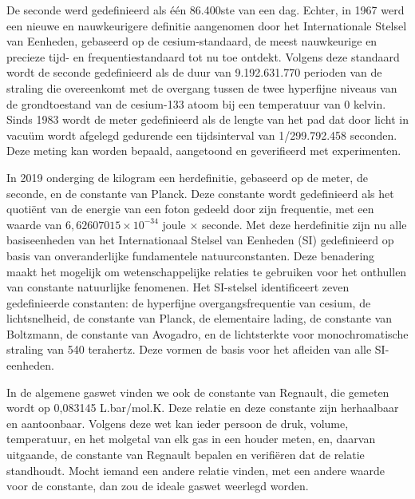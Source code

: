 \documentclass[
  a5paper,
  smalldemyvopaper,11pt,twoside,onecolumn,openright,extrafontsizes,
hidelinks]{memoir}
\begin{document}
De seconde werd gedefinieerd als één 86.400ste van een dag. Echter, in
1967 werd een nieuwe en nauwkeurigere definitie aangenomen door het
Internationale Stelsel van Eenheden, gebaseerd op de cesium-standaard,
de meest nauwkeurige en precieze tijd- en frequentiestandaard tot nu toe
ontdekt. Volgens deze standaard wordt de seconde gedefinieerd als de
duur van 9.192.631.770 perioden van de straling die overeenkomt met de
overgang tussen de twee hyperfijne niveaus van de grondtoestand van de
cesium-133 atoom bij een temperatuur van 0 kelvin. Sinds 1983 wordt de
meter gedefinieerd als de lengte van het pad dat door licht in vacuüm
wordt afgelegd gedurende een tijdsinterval van 1/299.792.458 seconden.
Deze meting kan worden bepaald, aangetoond en geverifieerd met
experimenten.

In 2019 onderging de kilogram een herdefinitie, gebaseerd op de meter,
de seconde, en de constante van Planck. Deze constante wordt
gedefinieerd als het quotiënt van de energie van een foton gedeeld door
zijn frequentie, met een waarde van \(6,62607015 \times 10^{-34}\) joule
\(\times\) seconde. Met deze herdefinitie zijn nu alle basiseenheden van
het Internationaal Stelsel van Eenheden (SI) gedefinieerd op basis van
onveranderlijke fundamentele natuurconstanten. Deze benadering maakt het
mogelijk om wetenschappelijke relaties te gebruiken voor het onthullen
van constante natuurlijke fenomenen. Het SI-stelsel identificeert zeven
gedefinieerde constanten: de hyperfijne overgangsfrequentie van cesium,
de lichtsnelheid, de constante van Planck, de elementaire lading, de
constante van Boltzmann, de constante van Avogadro, en de lichtsterkte
voor monochromatische straling van 540 terahertz. Deze vormen de basis
voor het afleiden van alle SI-eenheden.

In de algemene gaswet vinden we ook de constante van Regnault, die
gemeten wordt op 0,083145 L.bar/mol.K. Deze relatie en deze constante
zijn herhaalbaar en aantoonbaar. Volgens deze wet kan ieder persoon de
druk, volume, temperatuur, en het molgetal van elk gas in een houder
meten, en, daarvan uitgaande, de constante van Regnault bepalen en
verifiëren dat de relatie standhoudt. Mocht iemand een andere relatie
vinden, met een andere waarde voor de constante, dan zou de ideale
gaswet weerlegd worden.
\end{document}
